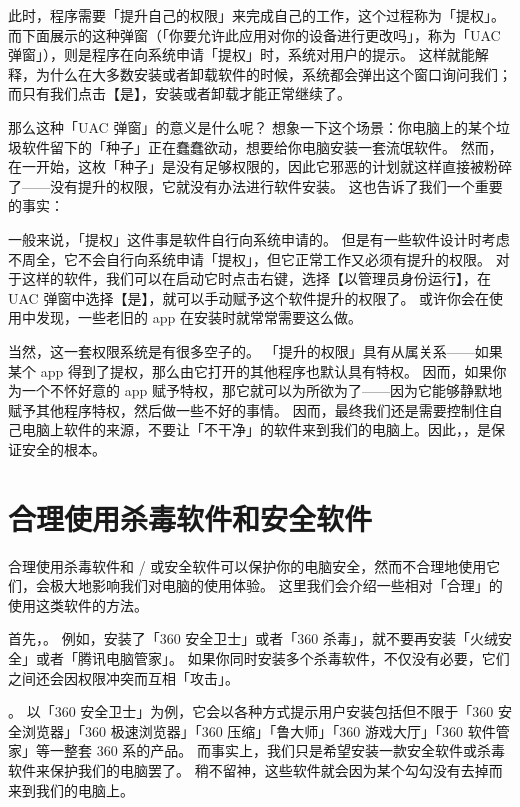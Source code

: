 此时，程序需要「提升自己的权限」来完成自己的工作，这个过程称为「提权」。
而下面展示的这种弹窗（「你要允许此应用对你的设备进行更改吗」，称为「UAC 弹窗」），则是程序在向系统申请「提权」时，系统对用户的提示。
这样就能解释，为什么在大多数安装或者卸载软件的时候，系统都会弹出这个窗口询问我们；而只有我们点击【是】，安装或者卸载才能正常继续了。

那么这种「UAC 弹窗」的意义是什么呢？
想象一下这个场景：你电脑上的某个垃圾软件留下的「种子」正在蠢蠢欲动，想要给你电脑安装一套流氓软件。
然而，在一开始，这枚「种子」是没有足够权限的，因此它邪恶的计划就这样直接被粉碎了——没有提升的权限，它就没有办法进行软件安装。
这也告诉了我们一个重要的事实：

一般来说，「提权」这件事是软件自行向系统申请的。
但是有一些软件设计时考虑不周全，它不会自行向系统申请「提权」，但它正常工作又必须有提升的权限。
对于这样的软件，我们可以在启动它时点击右键，选择【以管理员身份运行】，在 UAC 弹窗中选择【是】，就可以手动赋予这个软件提升的权限了。
或许你会在使用中发现，一些老旧的 app 在安装时就常常需要这么做。

当然，这一套权限系统是有很多空子的。
「提升的权限」具有从属关系——如果某个 app 得到了提权，那么由它打开的其他程序也默认具有特权。
因而，如果你为一个不怀好意的 app 赋予特权，那它就可以为所欲为了——因为它能够静默地赋予其他程序特权，然后做一些不好的事情。
因而，最终我们还是需要控制住自己电脑上软件的来源，不要让「不干净」的软件来到我们的电脑上。因此，，是保证安全的根本。

\section{合理使用杀毒软件和安全软件}

合理使用杀毒软件和 / 或安全软件可以保护你的电脑安全，然而不合理地使用它们，会极大地影响我们对电脑的使用体验。
这里我们会介绍一些相对「合理」的使用这类软件的方法。

首先，。
例如，安装了「360 安全卫士」或者「360 杀毒」，就不要再安装「火绒安全」或者「腾讯电脑管家」。
如果你同时安装多个杀毒软件，不仅没有必要，它们之间还会因权限冲突而互相「攻击」。

。
以「360 安全卫士」为例，它会以各种方式提示用户安装包括但不限于「360 安全浏览器」「360 极速浏览器」「360 压缩」「鲁大师」「360 游戏大厅」「360 软件管家」等一整套 360 系的产品。
而事实上，我们只是希望安装一款安全软件或杀毒软件来保护我们的电脑罢了。
稍不留神，这些软件就会因为某个勾勾没有去掉而来到我们的电脑上。

